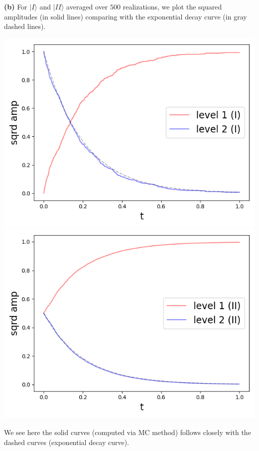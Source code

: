 \documentclass[11pt, oneside]{book}
\theoremstyle{break}
\theoremstyle{break}
\begin{document}
\hfill\break
\hfill\break
\textbf{(b)} For $|I\rangle$ and $|II\rangle$ averaged over $500$ realizations, we plot the squared amplitudes (in solid lines) comparing with the exponential decay curve (in gray dashed lines).
\begin{center}
\includegraphics[scale=0.39]{542HW2/I_averaged}\qquad
\includegraphics[scale=0.39]{542HW2/II_averaged}
\end{center}
We see here the solid curves (computed via MC method) follows closely with the dashed curves (exponential decay curve). 
\end{document}
